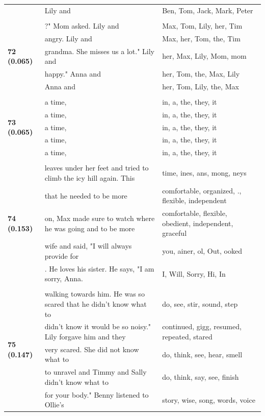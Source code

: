 \documentclass{article}
\theoremstyle{plain}
\theoremstyle{definition}
\theoremstyle{remark}
\begin{document}
\begin{longtable}{|p{}|p{}|p{}|}
& Lily and & Ben,  Tom,  Jack,  Mark,  Peter \\
& & \\
\multirow{5}{*}{\textbf{72 (0.065)}} & ?" Mom asked.  Lily and & Max,  Tom,  Lily,  her,  Tim \\
& angry.  Lily and & Max,  her,  Tom,  the,  Tim \\
& grandma. She misses us a lot."  Lily and & her,  Max,  Lily,  Mom,  mom \\
& happy."  Anna and & her,  Tom,  the,  Max,  Lily \\
& Anna and & her,  Tom,  Lily,  the,  Max \\
& & \\
\multirow{5}{*}{\textbf{73 (0.065)}} & a time, & in,  a,  the,  they,  it \\
& a time, & in,  a,  the,  they,  it \\
& a time, & in,  a,  the,  they,  it \\
& a time, & in,  a,  the,  they,  it \\
& a time, & in,  a,  the,  they,  it \\
& & \\
\multirow{5}{*}{\textbf{74 (0.153)}} & leaves under her feet and tried to climb the icy hill again.  This & time, ines, ans, mong, neys \\
& that he needed to be more & comfortable,  organized, .,  flexible,  independent \\
& on, Max made sure to watch where he was going and to be more & comfortable,  flexible,  obedient,  independent,  graceful \\
& wife and said, "I will always provide for & you, ainer, ol, Out, ooked \\
& . He loves his sister. He says, "I am sorry, Anna. & I,  Will,  Sorry,  Hi,  In \\
& & \\
\multirow{5}{*}{\textbf{75 (0.147)}} & walking towards him. He was so scared that he didn't know what to & do,  see,  stir,  sound,  step \\
& didn't know it would be so noisy." Lily forgave him and they & continued,  gigg,  resumed,  repeated,  stared \\
& very scared. She did not know what to & do,  think,  see,  hear,  smell \\
& to unravel and Timmy and Sally didn't know what to & do,  think,  say,  see,  finish \\
& for your body."  Benny listened to Ollie's & story,  wise,  song,  words,  voice \\

\end{longtable}
\end{document}

